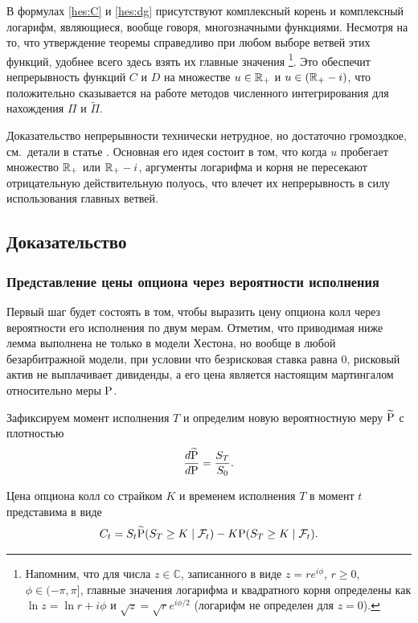 \begin{remark}
В формулах \eqref{hes:C} и \eqref{hes:dg} присутствуют комплексный корень и комплексный логарифм, являющиеся, вообще говоря, многозначными функциями.
Несмотря на то, что утверждение теоремы справедливо при любом выборе ветвей этих функций, удобнее всего здесь взять их главные значения%
\footnote{Напомним, что для числа $z\in\mathbb{C}$, записанного в виде $z=re^{i\phi}$, $r\ge 0$, $\phi\in(-\pi,\pi]$, главные значения логарифма и квадратного корня определены как $\ln z = \ln r + i\phi$ и $\sqrt{z} = \sqrt{r}e^{i\phi/2}$ (логарифм не определен для $z=0$).}. Это обеспечит непрерывность функций $C$ и $D$ на множестве $u\in\R_+$ и $u\in (\R_+-i)$, что положительно сказывается на работе методов численного интегрирования для нахождения $\Pi$ и $\tilde\Pi$.

Доказательство непрерывности технически нетрудное, но достаточно громоздкое, см.~детали в статье \cite{Albrecher+07}.
Основная его идея состоит в том, что когда $u$ пробегает множество $\R_+$ или $\R_+-i$, аргументы логарифма и корня не пересекают отрицательную действительную полуось, что влечет их непрерывность в силу использования главных ветвей.
\end{remark}


\subsection{Доказательство}
\subsubsection{Представление цены опциона через вероятности исполнения}

Первый шаг будет состоять в том, чтобы выразить цену опциона колл через вероятности его исполнения по двум мерам.
Отметим, что приводимая ниже лемма выполнена не только в модели Хестона, но вообще в любой безарбитражной модели, при условии что безрисковая ставка равна 0, рисковый актив не выплачивает дивиденды, а его цена является настоящим мартингалом относительно меры $\P$.

Зафиксируем момент исполнения $T$ и определим новую вероятностную меру $\tilde\P$ с плотностью
\[
\frac{d\tilde\P}{d\P} = \frac{S_T}{S_0}. 
\]

\begin{lemma}
\label{hes:l:price-through-prob}
Цена опциона колл со страйком $K$ и временем исполнения $T$ в момент $t$ представима в виде 
\[
C_t = S_t \tilde\P(S_T\ge K\mid \F_t) - K\P(S_T\ge K\mid \F_t).
\]
\end{lemma}

